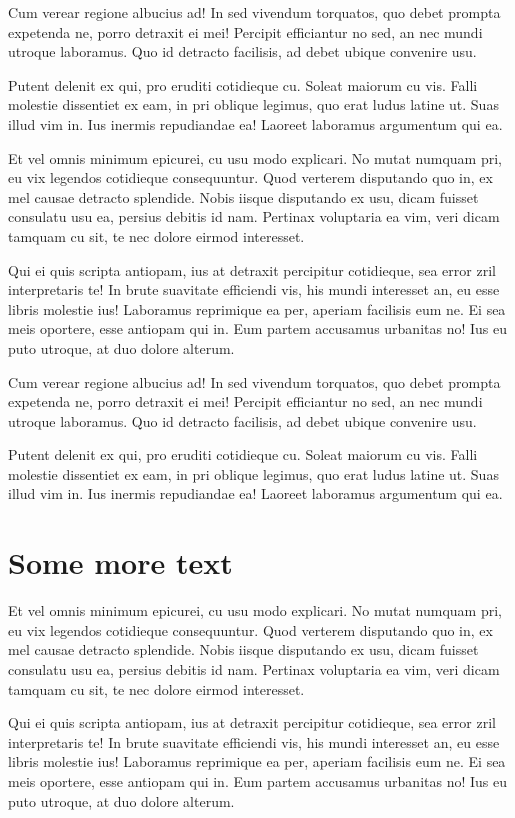 Cum verear regione albucius ad! In sed vivendum torquatos, quo debet prompta
expetenda ne, porro detraxit ei mei! Percipit efficiantur no sed, an nec mundi
utroque laboramus. Quo id detracto facilisis, ad debet ubique convenire usu.

Putent delenit ex qui, pro eruditi cotidieque cu. Soleat maiorum cu vis. Falli
molestie dissentiet ex eam, in pri oblique legimus, quo erat ludus latine ut.
Suas illud vim in. Ius inermis repudiandae ea! Laoreet laboramus argumentum qui
ea.

Et vel omnis minimum epicurei, cu usu modo explicari. No mutat numquam pri, eu
vix legendos cotidieque consequuntur. Quod verterem disputando quo in, ex mel
causae detracto splendide. Nobis iisque disputando ex usu, dicam fuisset
consulatu usu ea, persius debitis id nam. Pertinax voluptaria ea vim, veri dicam
tamquam cu sit, te nec dolore eirmod interesset.

Qui ei quis scripta antiopam, ius at detraxit percipitur cotidieque, sea error
zril interpretaris te! In brute suavitate efficiendi vis, his mundi interesset
an, eu esse libris molestie ius! Laboramus reprimique ea per, aperiam facilisis
eum ne. Ei sea meis oportere, esse antiopam qui in. Eum partem accusamus
urbanitas no! Ius eu puto utroque, at duo dolore alterum.

Cum verear regione albucius ad! In sed vivendum torquatos, quo debet prompta
expetenda ne, porro detraxit ei mei! Percipit efficiantur no sed, an nec mundi
utroque laboramus. Quo id detracto facilisis, ad debet ubique convenire usu.

Putent delenit ex qui, pro eruditi cotidieque cu. Soleat maiorum cu vis. Falli
molestie dissentiet ex eam, in pri oblique legimus, quo erat ludus latine ut.
Suas illud vim in. Ius inermis repudiandae ea! Laoreet laboramus argumentum qui
ea.

\section{Some more text}

Et vel omnis minimum epicurei, cu usu modo explicari. No mutat numquam pri, eu
vix legendos cotidieque consequuntur. Quod verterem disputando quo in, ex mel
causae detracto splendide. Nobis iisque disputando ex usu, dicam fuisset
consulatu usu ea, persius debitis id nam. Pertinax voluptaria ea vim, veri dicam
tamquam cu sit, te nec dolore eirmod interesset.

Qui ei quis scripta antiopam, ius at detraxit percipitur cotidieque, sea error
zril interpretaris te! In brute suavitate efficiendi vis, his mundi interesset
an, eu esse libris molestie ius! Laboramus reprimique ea per, aperiam facilisis
eum ne. Ei sea meis oportere, esse antiopam qui in. Eum partem accusamus
urbanitas no! Ius eu puto utroque, at duo dolore alterum.

